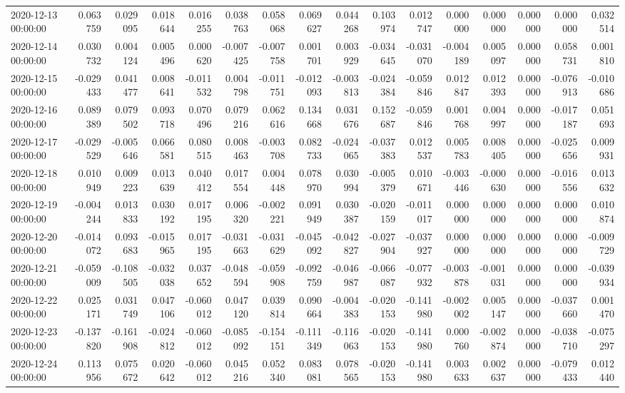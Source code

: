 \begin{tabular}{lrrrrrrrrrrrrrrr}
2020-12-13 00:00:00 & 0.063759 & 0.029095 & 0.018644 & 0.016255 & 0.038763 & 0.058068 & 0.069627 & 0.044268 & 0.103974 & 0.012747 & 0.000000 & 0.000000 & 0.000000 & 0.000000 & 0.032514 \\
2020-12-14 00:00:00 & 0.030732 & 0.004124 & 0.005496 & 0.000620 & -0.007425 & -0.007758 & 0.001701 & 0.003929 & -0.034645 & -0.031070 & -0.004189 & 0.005097 & 0.000000 & 0.058731 & 0.001810 \\
2020-12-15 00:00:00 & -0.029433 & 0.041477 & 0.008641 & -0.011532 & 0.004798 & -0.011751 & -0.012093 & -0.003813 & -0.024384 & -0.059846 & 0.012847 & 0.012393 & 0.000000 & -0.076913 & -0.010686 \\
2020-12-16 00:00:00 & 0.089389 & 0.079502 & 0.093718 & 0.070496 & 0.079216 & 0.062616 & 0.134668 & 0.031676 & 0.152687 & -0.059846 & 0.001768 & 0.004997 & 0.000000 & -0.017187 & 0.051693 \\
2020-12-17 00:00:00 & -0.029529 & -0.005646 & 0.066581 & 0.080515 & 0.008463 & -0.003708 & 0.082733 & -0.024065 & -0.037383 & 0.012537 & 0.005783 & 0.008405 & 0.000000 & -0.025656 & 0.009931 \\
2020-12-18 00:00:00 & 0.010949 & 0.009223 & 0.013639 & 0.040412 & 0.017554 & 0.004448 & 0.078970 & 0.030994 & -0.005379 & 0.010671 & -0.003446 & -0.000630 & 0.000000 & -0.016556 & 0.013632 \\
2020-12-19 00:00:00 & -0.004244 & 0.013833 & 0.030192 & 0.017195 & 0.006320 & -0.002221 & 0.091949 & 0.030387 & -0.020159 & -0.011017 & 0.000000 & 0.000000 & 0.000000 & 0.000000 & 0.010874 \\
2020-12-20 00:00:00 & -0.014072 & 0.093683 & -0.015965 & 0.017195 & -0.031663 & -0.031629 & -0.045092 & -0.042827 & -0.027904 & -0.037927 & 0.000000 & 0.000000 & 0.000000 & 0.000000 & -0.009729 \\
2020-12-21 00:00:00 & -0.059009 & -0.108505 & -0.032038 & 0.037652 & -0.048594 & -0.059908 & -0.092759 & -0.046987 & -0.066087 & -0.077932 & -0.003878 & -0.001031 & 0.000000 & 0.000000 & -0.039934 \\
2020-12-22 00:00:00 & 0.025171 & 0.031749 & 0.047106 & -0.060012 & 0.047120 & 0.039814 & 0.090664 & -0.004383 & -0.020153 & -0.141980 & -0.002002 & 0.005147 & 0.000000 & -0.037660 & 0.001470 \\
2020-12-23 00:00:00 & -0.137820 & -0.161908 & -0.024812 & -0.060012 & -0.085092 & -0.154151 & -0.111349 & -0.116063 & -0.020153 & -0.141980 & 0.000760 & -0.002874 & 0.000000 & -0.038710 & -0.075297 \\
2020-12-24 00:00:00 & 0.113956 & 0.075672 & 0.020642 & -0.060012 & 0.045216 & 0.052340 & 0.083081 & 0.078565 & -0.020153 & -0.141980 & 0.003633 & 0.002637 & 0.000000 & -0.079433 & 0.012440 \\

\end{tabular}
